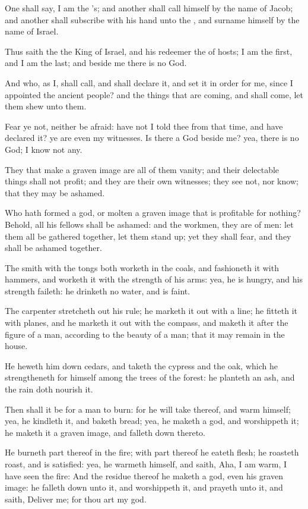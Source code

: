 \Verse One shall say, I am the \LORD's; and another shall call himself by the name of Jacob; and another shall subscribe with his hand unto the \LORD, and surname himself by the name of Israel.

\Verse Thus saith the \LORD the King of Israel, and his redeemer the \LORD of hosts; I am the first, and I am the last; and beside me there is no God.

\Verse And who, as I, shall call, and shall declare it, and set it in order for me, since I appointed the ancient people? and the things that are coming, and shall come, let them shew unto them.

\Verse Fear ye not, neither be afraid: have not I told thee from that time, and have declared it? ye are even my witnesses. Is there a God beside me? yea, there is no God; I know not any.

\Verse They that make a graven image are all of them vanity; and their delectable things shall not profit; and they are their own witnesses; they see not, nor know; that they may be ashamed.

\Verse Who hath formed a god, or molten a graven image that is profitable for nothing?  \Verse Behold, all his fellows shall be ashamed: and the workmen, they are of men: let them all be gathered together, let them stand up; yet they shall fear, and they shall be ashamed together.

\Verse The smith with the tongs both worketh in the coals, and fashioneth it with hammers, and worketh it with the strength of his arms: yea, he is hungry, and his strength faileth: he drinketh no water, and is faint.

\Verse The carpenter stretcheth out his rule; he marketh it out with a line; he fitteth it with planes, and he marketh it out with the compass, and maketh it after the figure of a man, according to the beauty of a man; that it may remain in the house.

\Verse He heweth him down cedars, and taketh the cypress and the oak, which he strengtheneth for himself among the trees of the forest: he planteth an ash, and the rain doth nourish it.

\Verse Then shall it be for a man to burn: for he will take thereof, and warm himself; yea, he kindleth it, and baketh bread; yea, he maketh a god, and worshippeth it; he maketh it a graven image, and falleth down thereto.

\Verse He burneth part thereof in the fire; with part thereof he eateth flesh; he roasteth roast, and is satisfied: yea, he warmeth himself, and saith, Aha, I am warm, I have seen the fire: \Verse And the residue thereof he maketh a god, even his graven image: he falleth down unto it, and worshippeth it, and prayeth unto it, and saith, Deliver me; for thou art my god.

